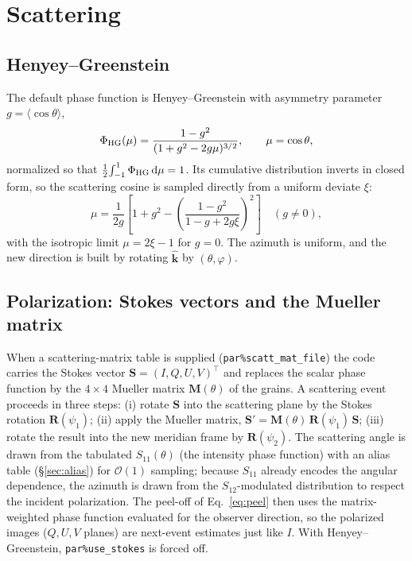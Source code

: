 \documentclass[english,a4paper]{kiseon_memo}
\newcommand{\khat}{\hat{\mathbf k}}
\newcommand{\dd}{\mathrm{d}}
\newcommand{\pp}[1]{\texttt{par\%#1}}
\begin{document}
\section{Scattering}

\subsection{Henyey--Greenstein}
The default phase function is Henyey--Greenstein with asymmetry parameter
$g=\langle\cos\theta\rangle$,
\begin{equation}
  \Phi_{\rm HG}(\mu) = \frac{1-g^2}{(1+g^2-2g\mu)^{3/2}},\qquad \mu=\cos\theta,
\end{equation}
normalized so that $\tfrac12\!\int_{-1}^{1}\Phi_{\rm HG}\,\dd\mu = 1$.  Its
cumulative distribution inverts in closed form, so the scattering cosine is
sampled directly from a uniform deviate $\xi$:
\begin{equation}
  \mu = \frac{1}{2g}\left[1+g^2-\left(\frac{1-g^2}{1-g+2g\xi}\right)^{2}\right]
        \quad (g\neq0),
\end{equation}
with the isotropic limit $\mu=2\xi-1$ for $g=0$.  The azimuth is uniform, and
the new direction is built by rotating $\khat$ by $(\theta,\varphi)$.

\subsection{Polarization: Stokes vectors and the Mueller matrix}
When a scattering-matrix table is supplied (\pp{scatt\_mat\_file}) the code
carries the Stokes vector $\mathbf S=(I,Q,U,V)^{\!\top}$ and replaces the scalar
phase function by the $4\times4$ Mueller matrix $\mathbf M(\theta)$ of the
grains.  A scattering event proceeds in three steps: (i) rotate $\mathbf S$ into
the scattering plane by the Stokes rotation $\mathbf R(\psi_1)$; (ii) apply the
Mueller matrix, $\mathbf S'=\mathbf M(\theta)\,\mathbf R(\psi_1)\,\mathbf S$;
(iii) rotate the result into the new meridian frame by $\mathbf R(\psi_2)$.  The
scattering angle is drawn from the tabulated $S_{11}(\theta)$ (the intensity
phase function) with an alias table (\S\ref{sec:alias}) for $\mathcal O(1)$
sampling; because $S_{11}$ already encodes the angular dependence, the azimuth is
drawn from the $S_{12}$-modulated distribution to respect the incident
polarization.  The peel-off of Eq.~\eqref{eq:peel} then uses the
matrix-weighted phase function evaluated for the observer direction, so the
polarized images ($Q,U,V$ planes) are next-event estimates just like $I$.  With
Henyey--Greenstein, \pp{use\_stokes} is forced off.
\end{document}
